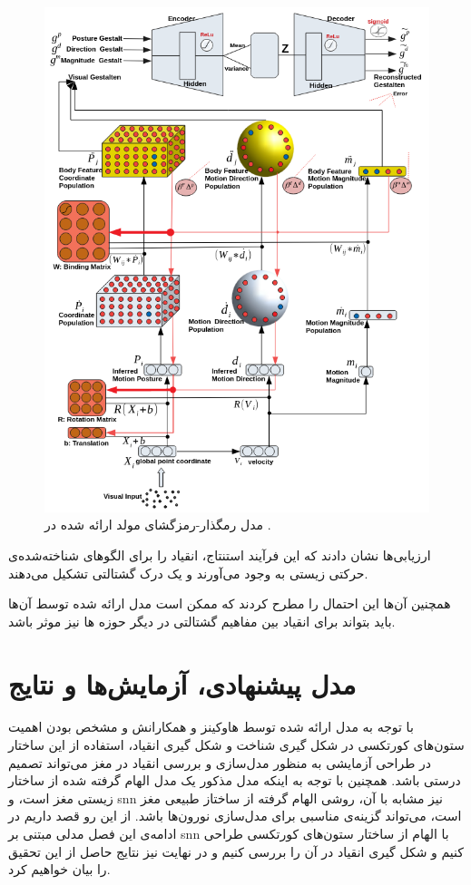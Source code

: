 \documentclass[12pt]{report}
\begin{document}
\begin{figure}[H]
	\centering
	\includegraphics[width=0.7\linewidth]{gnn.png}
	\caption[NS]{
		مدل رمگذار-رمزگشای مولد ارائه شده در  \cite{Sadeghi2021}.
	}
	\label{fig:gnn}
\end{figure}

ارزیابی‌ها نشان دادند که این فرآیند استنتاج، انقیاد را برای الگو‌های شناخته‌شده‌ی حرکتی زیستی به وجود می‌آورند و یک درک گشتالتی  تشکیل می‌دهند.
	
	همچنین آن‌ها این احتمال را مطرح کردند که ممکن است مدل ارائه شده توسط آن‌ها باید بتواند برای انقیاد بین مفاهیم گشتالتی در دیگر حوزه ها نیز موثر باشد.
	
	
	\chapter{مدل پیشنهادی، آزمایش‌ها و نتایج}
	
	با توجه به مدل ارائه شده توسط هاوکینز و همکارانش و مشخص بودن اهمیت ستون‌های کورتکسی در شکل گیری شناخت و شکل گیری انقیاد، استفاده از این ساختار در طراحی آزمایشی به منظور مدل‌سازی و بررسی انقیاد در مغز می‌تواند تصمیم درستی باشد. همچنین با توجه به اینکه مدل مذکور یک مدل الهام گرفته شده از ساختار زیستی مغز است، و \gls{snn} نیز مشابه با آن، روشی الهام گرفته از ساختاز طبیعی مغز است، می‌تواند گزینه‌ی مناسبی برای مدل‌سازی نورون‌ها باشد. از این رو قصد داریم در ادامه‌ی این فصل مدلی مبتنی بر \gls{snn} با الهام از ساختار ستون‌های کورتکسی طراحی کنیم و شکل گیری انقیاد در آن را بررسی کنیم و در نهایت نیز نتایج حاصل از این تحقیق را بیان خواهیم کرد.
	
\end{document}
